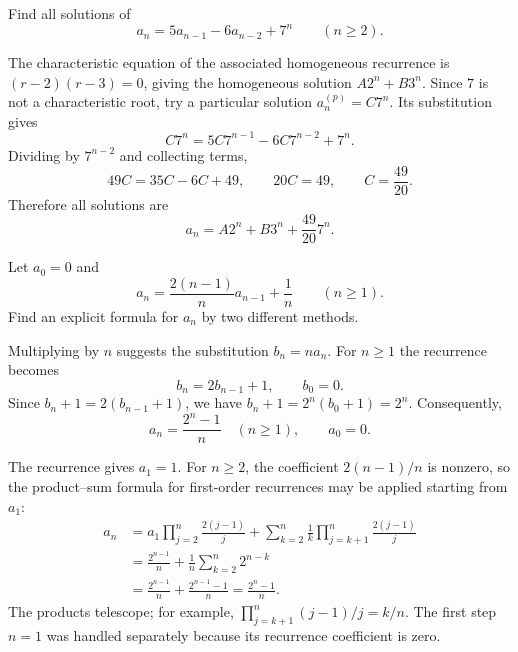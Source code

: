 \documentclass[11pt, oneside]{article}
\begin{document}
\begin{problem}
Find all solutions of
\[
a_n=5a_{n-1}-6a_{n-2}+7^n\qquad(n\ge2).
\]
\end{problem}
\begin{solution}
The characteristic equation of the associated homogeneous recurrence is
$(r-2)(r-3)=0$, giving the homogeneous solution $A2^n+B3^n$.
Since $7$ is not a characteristic root, try a particular solution
$a_n^{(p)}=C7^n$. Its substitution gives
\[
C7^n=5C7^{n-1}-6C7^{n-2}+7^n.
\]
Dividing by $7^{n-2}$ and collecting terms,
\[
49C=35C-6C+49,
\qquad 20C=49,
\qquad C=\frac{49}{20}.
\]
Therefore all solutions are
\[
\boxed{a_n=A2^n+B3^n+\frac{49}{20}7^n.}
\]
\end{solution}

\begin{problem}
Let $a_0=0$ and
\[
a_n=\frac{2(n-1)}{n}a_{n-1}+\frac1n
\qquad(n\ge1).
\]
Find an explicit formula for $a_n$ by two different methods.
\end{problem}
\begin{solution}[1]
Multiplying by $n$ suggests the substitution $b_n=na_n$.
For $n\ge1$ the recurrence becomes
\[
b_n=2b_{n-1}+1, \qquad b_0=0.
\]
Since $b_n+1=2(b_{n-1}+1)$, we have
$b_n+1=2^n(b_0+1)=2^n$. Consequently,
\[
\boxed{a_n=\frac{2^n-1}{n}\quad(n\ge1), \qquad a_0=0.}
\]
\end{solution}
\begin{solution}[2]
The recurrence gives $a_1=1$. For $n\ge2$, the coefficient
$2(n-1)/n$ is nonzero, so the product--sum formula for first-order
recurrences may be applied starting from $a_1$:
\[
\begin{aligned}
a_n&=a_1\prod_{j=2}^{n}\frac{2(j-1)}j
  +\sum_{k=2}^{n}\frac1k\prod_{j=k+1}^{n}\frac{2(j-1)}j\\
&=\frac{2^{n-1}}n
  +\frac1n\sum_{k=2}^{n}2^{n-k}\\
&=\frac{2^{n-1}}n+\frac{2^{n-1}-1}{n}
=\frac{2^n-1}{n}.
\end{aligned}
\]
The products telescope; for example,
$\displaystyle\prod_{j=k+1}^{n}(j-1)/j=k/n$. The first step
$n=1$ was handled separately because its recurrence coefficient is zero.
\end{solution}
\end{document}
